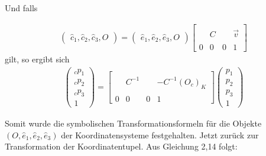 Und falls

\begin{gather}
\begin{pmatrix}
\hat{c}_1,\hat{c}_2,\hat{c}_3,O
\end{pmatrix}
=
\begin{pmatrix}
\hat{e}_1,\hat{e}_2,\hat{e}_3,O
\end{pmatrix}
\begin{bmatrix}
&  &  & \\
&  C&  &\vec{v} \\ 
&  &  & \\
0&0&0 & 1
\end{bmatrix}
\end{gather}
gilt, so ergibt sich
\begin{gather}
\begin{pmatrix}
_cp_1\\
_cp_2\\
_cp_3\\
1
\end{pmatrix}
=
\begin{bmatrix}
&  &  & \\
&  C^{-1}&  &-C^{-1}(O_c)_K \\ 
&  &  & \\
0&0&0 & 1
\end{bmatrix}
\begin{pmatrix}
p_1\\
p_2\\
p_3\\
1
\end{pmatrix}
\end{gather}


Somit wurde die symbolischen Transformationsformeln für die Objekte \ensuremath{(O,\hat{e}_1,\hat{e}_2,\hat{e}_3)} der Koordinatensysteme festgehalten. Jetzt zurück zur Transformation der Koordinatentupel. Aus Gleichung 2,14 folgt:\\


